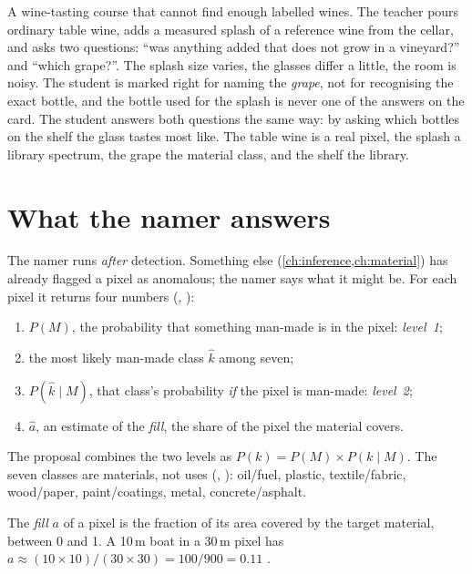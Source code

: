 \begin{analogy}
A wine-tasting course that cannot find enough labelled wines. The teacher pours ordinary table wine, adds a measured
splash of a reference wine from the cellar, and asks two questions: ``was anything added that does not grow in a
vineyard?'' and ``which grape?''. The splash size varies, the glasses differ a little, the room is noisy. The student
is marked right for naming the \emph{grape}, not for recognising the exact bottle, and the bottle used for the splash
is never one of the answers on the card. The student answers both questions the same way: by asking which bottles on
the shelf the glass tastes most like. The table wine is a real pixel, the splash a library spectrum, the grape the
material class, and the shelf the library.
\end{analogy}

\section{What the namer answers}\label{sec:namer:question}

The namer runs \emph{after} detection. Something else (\cref{ch:inference,ch:material}) has already flagged a pixel
as anomalous; the namer says what it might be. For each pixel it returns four numbers (,
):
\begin{enumerate}
\item $P(M)$, the probability that something man-made is in the pixel: \emph{level~1};
\item the most likely man-made class $\hat k$ among seven;
\item $P(\hat k\mid M)$, that class's probability \emph{if} the pixel is man-made: \emph{level~2};
\item $\hat a$, an estimate of the \emph{fill}, the share of the pixel the material covers.
\end{enumerate}
The proposal combines the two levels as $P(k)=P(M)\times P(k\mid M)$. The seven classes are materials, not uses
(, ): oil/fuel, plastic, textile/fabric, wood/paper, paint/coatings,
metal, concrete/asphalt.

\begin{definition}[Fill]
The \emph{fill} $a$ of a pixel is the fraction of its area covered by the target material, between 0 and
1. A 10\,m boat in a 30\,m pixel has $a\approx(10\times10)/(30\times30)=100/900=0.11$ \tagA.
\end{definition}

